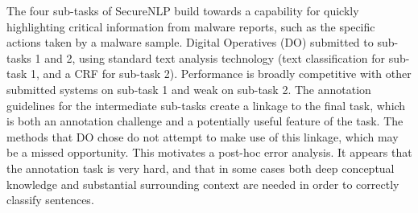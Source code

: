 The four sub-tasks of SecureNLP build towards a capability for quickly highlighting critical information from malware reports, such as the specific actions taken by a  malware sample. Digital Operatives (DO) submitted to sub-tasks 1 and 2, using standard text analysis technology (text classification for sub-task 1, and a CRF for sub-task 2). Performance is broadly competitive with other submitted systems on sub-task 1 and weak on sub-task 2. The annotation guidelines for the intermediate sub-tasks create a linkage to the final task, which is both an annotation challenge and a potentially useful feature of the task. The methods that DO chose do not attempt to make use of this linkage, which may be a missed opportunity. This motivates a post-hoc error analysis. It appears that the annotation task is very hard, and that in some cases both deep conceptual knowledge and substantial surrounding context are needed in order to correctly classify sentences.
